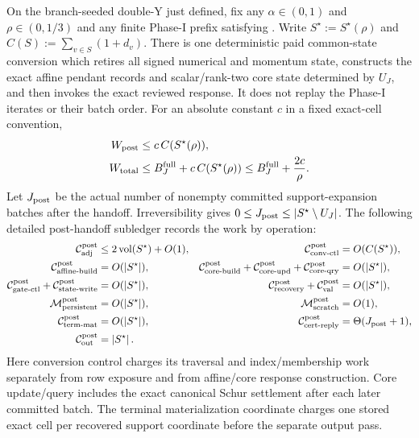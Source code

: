 \begin{theorem}
\label{thm:double-y-composite-response-handoff}
On the branch-seeded double-Y just defined, fix any
$\alpha\in(0,1)$ and $\rho\in(0,1/3)$ and any finite Phase-I prefix satisfying
.  Write
$S^\star:=S^\star(\rho)$ and
$C(S):=\sum_{v\in S}(1+d_v)$.  There is one deterministic paid
common-state conversion which retires all signed numerical and momentum
state, constructs the exact affine pendant records and scalar/rank-two core
state determined by $U_J$, and then invokes the exact reviewed response.  It
does not replay the Phase-I iterates or their batch order.  For an absolute
constant $c$ in a fixed exact-cell convention,
\begin{align}
 W_{\rm post}
 &\leq c\,C(S^\star(\rho)),
 \notag\\
 W_{\rm total}
 &\leq B_J^{\rm full}+c\,C(S^\star(\rho))
 \leq B_J^{\rm full}+\frac{2c}{\rho}.
 \label{eq:double-y-composite-work}
\end{align}
Let $J_{\rm post}$ be the actual number of nonempty committed
support-expansion batches after the handoff.  Irreversibility gives
$0\leq J_{\rm post}\leq\left\lvert S^\star\setminus U_J \right\rvert$.
The following detailed post-handoff subledger records the work by operation:
\begin{align}
 \mathcal C_{\rm adj}^{\rm post}
 &\leq2\operatorname{vol}(S^\star)+O(1),
 &
 \mathcal C_{\rm conv\text{-}ctl}^{\rm post}
 &=O(C(S^\star)),
 \notag\\
 \mathcal C_{\rm affine\text{-}build}^{\rm post}
 &=O(\left\lvert S^\star \right\rvert),
 &
 \mathcal C_{\rm core\text{-}build}^{\rm post}
  +\mathcal C_{\rm core\text{-}upd}^{\rm post}
  +\mathcal C_{\rm core\text{-}qry}^{\rm post}
 &=O(\left\lvert S^\star \right\rvert),
 \notag\\
 \mathcal C_{\rm gate\text{-}ctl}^{\rm post}
  +\mathcal C_{\rm state\text{-}write}^{\rm post}
 &=O(\left\lvert S^\star \right\rvert),
 &
 \mathcal C_{\rm recovery}^{\rm post}
  +\mathcal C_{\rm val}^{\rm post}
 &=O(\left\lvert S^\star \right\rvert),
 \label{eq:double-y-composite-resources}\\
 \mathcal M_{\rm persistent}^{\rm post}
 &=O(\left\lvert S^\star \right\rvert),
 &
 \mathcal M_{\rm scratch}^{\rm post}
 &=O(1),
 \notag\\
 \mathcal C_{\rm term\text{-}mat}^{\rm post}
 &=O(\left\lvert S^\star \right\rvert),
 &
 \mathcal C_{\rm cert\text{-}reply}^{\rm post}
 &=\Theta(J_{\rm post}+1),
 \notag\\
 \mathcal C_{\rm out}^{\rm post}
 &=\left\lvert S^\star \right\rvert.
 \notag
\end{align}
Here conversion control charges its traversal and index/membership work
separately from row exposure and from affine/core response construction.  Core
update/query includes the exact canonical Schur settlement after each later
committed batch.  The terminal materialization coordinate charges one stored
exact cell per recovered support coordinate before the separate output pass.


\end{theorem}
